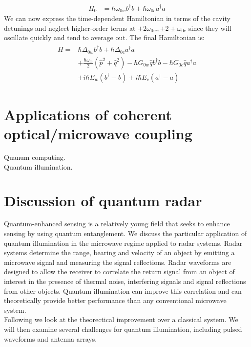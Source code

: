 \documentclass[a4paper,10pt,twocolumn]{article}
\numberwithin{equation}{section}
\begin{document}
\begin{align}
 H_0 &= \hbar\omega_{0w}b^\dagger b +\hbar\omega_{0c}a^\dagger a
\end{align}
We can now express the time-dependent Hamiltonian in terms of the cavity detunings and neglect higher-order terms at $\pm2\omega_{0w},\pm2\pm\omega_{0c}$ since they will oscillate quickly and tend to average out.
The final Hamiltonian is:
\begin{align}
\begin{split}
 H = &\hbar\Delta_{0w}b^\dagger b+\hbar\Delta_{0c}a^\dagger a\\
     &+\frac{\hbar\omega_m}{2}(\hat{p}^2+\hat{q}^2)-\hbar G_{0w}\hat{q}b^\dagger b-\hbar G_{0c}\hat{q}a^\dagger a\\
     &+i\hbar E_w(b^\dagger -b)+i\hbar E_c(a^\dagger -a )
\end{split}
\end{align}

\section{Applications of coherent optical/microwave coupling}
Quanum computing.\\
Quantum illumination.
\section{Discussion of quantum radar}
Quantum-enhanced sensing is a relatively young field that seeks to enhance sensing by using quantum entanglement. 
We discuss the particular application of quantum illumination in the microwave regime applied to radar systems.
Radar systems determine the range, bearing and velocity of an object by emitting a microwave signal and measuring the signal reflections.
Radar waveforms are designed to allow the receiver to correlate the return signal from an object of interest in the presence of thermal noise, interfering signals and signal reflections from other objects.
Quantum illumination can improve this correlation and can theoretically provide better performance than any conventional microwave system. 
\\
Following \cite{qi} we look at the theorectical improvement over a classical system. 
We will then examine several challenges for quantum illumination, including pulsed waveforms and antenna arrays.
\printbibliography
\end{document}

